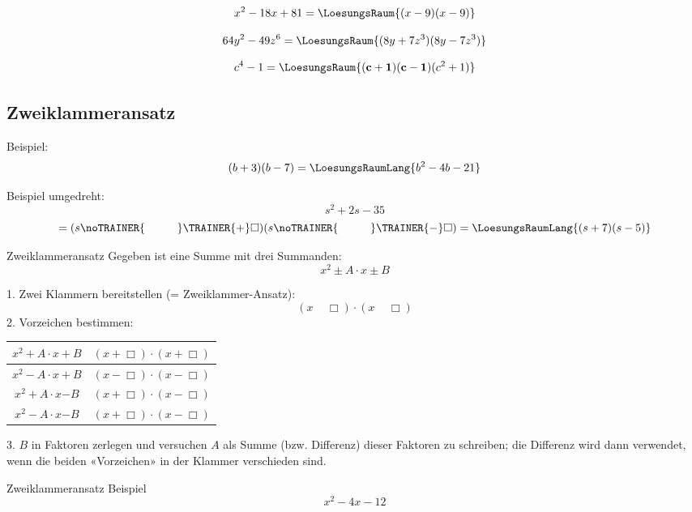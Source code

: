 $$x^2 -18x + 81 = \LoesungsRaum{(x-9)(x-9)}$$

$$64y^2 - 49z^6 = \LoesungsRaum{(8y+7z^3)(8y-7z^3)}$$

$$c^4 - 1 = \LoesungsRaum{\mathbf{(c+1)(c-1)}(c^2+1)}$$






\newpage


\subsection{Zweiklammeransatz}
Beispiel: $$(b+3)(b-7)= \LoesungsRaumLang{b^2-4b-21}$$

Beispiel umgedreht: $$s^2+2s-35$$
$$=(s\noTRAINER{\hspace{1cm}}\TRAINER{+}\Box{})(s\noTRAINER{\hspace{1cm}}\TRAINER{-}\Box{}) = \LoesungsRaumLang{(s+7)(s-5)}$$


\begin{rezept}{Zweiklammeransatz}{}
Gegeben ist eine Summe mit drei Summanden:
$$x^2 \pm A\cdot{}x \pm B$$

1. Zwei Klammern bereitstellen (= Zweiklammer-Ansatz):
$$(x \,\,\,\,\,\,\, \Box)\cdot{}(x \,\,\,\,\,\,\, \Box)$$
2. Vorzeichen bestimmen:
\leserluft{}

  \begin{tabular}{|c@{$\Longrightarrow$}c|}\hline
   $x^2 + A\cdot{} x + B$ & $(x + \Box)\cdot{}(x + \Box)$\\\hline
   $x^2 - A\cdot{} x + B$ & $(x - \Box)\cdot{}(x - \Box)$\\\hline
   $x^2 + A\cdot{} x \mathbf{-} B$ & $(x + \Box)\cdot{}(x - \Box)$\\\hline
   $x^2 - A\cdot{} x \mathbf{-} B$ & $(x + \Box)\cdot{}(x - \Box)$\\\hline
   \end{tabular} 

\leserluft{}

3. $B$ in Faktoren zerlegen und versuchen $A$ als Summe
(bzw. Differenz) dieser Faktoren zu schreiben; die Differenz wird dann
verwendet, wenn die beiden «Vorzeichen» in der Klammer verschieden sind.
\end{rezept}
\newpage
\begin{beispiel}{Zweiklammeransatz}{}
Beispiel
$$x^2 - 4x - 12$$
\end{beispiel}



